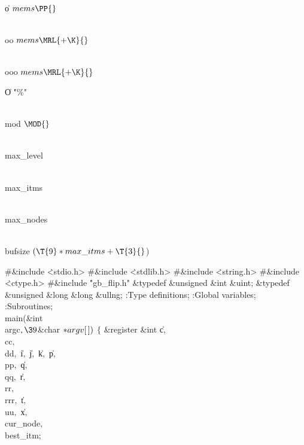 \Y\B\4\D\|o\5
$\\{mems}\PP{}$\par
\B\4\D\\{oo}\5
$\\{mems}\MRL{+{\K}}{}$\par
\B\4\D\\{ooo}\5
$\\{mems}\MRL{+{\K}}{}$\par
\B\4\D\|O\5
\.{"\%"}\par
\B\4\D\\{mod}\5
$\MOD{}$\par
\B\4\D\\{max\_level}\5
\par
\B\4\D\\{max\_itms}\5
\par
\B\4\D\\{max\_nodes}\5
\par
\B\4\D\\{bufsize}\5
$(\T{9}*\\{max\_itms}+\T{3}{}$)%
\par
\Y\B\8\#\&{include} \.{<stdio.h>}\6
\8\#\&{include} \.{<stdlib.h>}\6
\8\#\&{include} \.{<string.h>}\6
\8\#\&{include} \.{<ctype.h>}\6
\8\#\&{include} \.{"gb\_flip.h"}\6
\&{typedef} \&{unsigned} \&{int} \&{uint};\6
\&{typedef} \&{unsigned} \&{long} \&{long} \&{ullng};\7
:Type definitions\X;\6
:Global variables\X;\6
:Subroutines\X;\7
\\{main}(\&{int} \\{argc}${},\39{}$\&{char} ${}{*}\\{argv}[\,]){}$\1\1\2\2\6
${}\{{}$\1\6
\&{register} \&{int} \|c${},{}$ \\{cc}${},{}$ \\{dd}${},{}$ \|i${},{}$ %
\|j${},{}$ \|k${},{}$ \|p${},{}$ \\{pp}${},{}$ \|q${},{}$ \\{qq}${},{}$ %
\|r${},{}$ \\{rr}${},{}$ \\{rrr}${},{}$ \|t${},{}$ \\{uu}${},{}$ \|x${},{}$ %
\\{cur\_node}${},{}$ \\{best\_itm};\7
